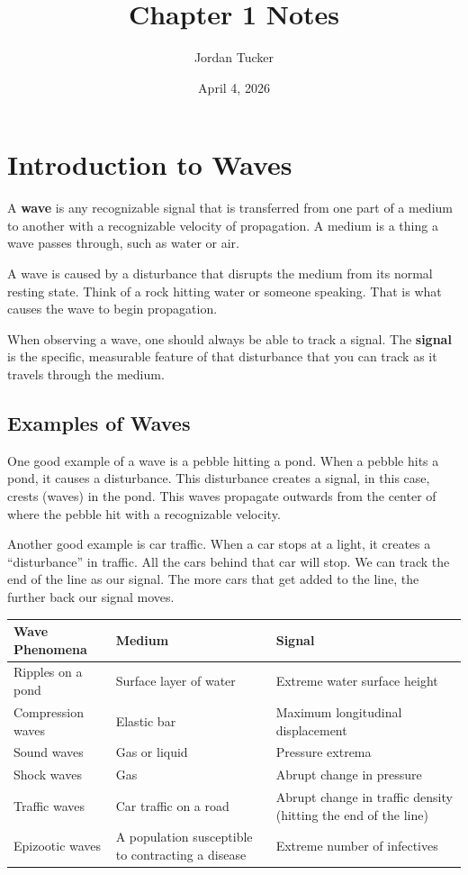 \documentclass[12pt, letterpaper]{article}
\title{Chapter 1 Notes}
\author{Jordan Tucker}
\date{April 4, 2026}
\begin{document}
    \maketitle

    \section{Introduction to Waves}\label{sec:introduction-to-waves}
    A \textbf{wave} is any recognizable signal that is transferred from one part of a medium to another with
    a recognizable velocity of propagation.
    A medium is a thing a wave passes through, such as water
    or air.

    A wave is caused by a disturbance that disrupts the medium from its normal resting state.
    Think of a rock hitting water or someone speaking.
    That is what causes the wave to begin propagation.

    When observing a wave, one should always be able to track a signal.
    The \textbf{signal} is the specific, measurable feature of that disturbance that you can track
    as it travels through the medium.

    \subsection{Examples of Waves}\label{subsec:examples-of-waves}
    One good example of a wave is a pebble hitting a pond.
    When a pebble hits a pond, it causes a disturbance.
    This disturbance creates a signal, in this case, crests (waves) in the pond.
    This waves propagate outwards from the center of where the pebble hit with a recognizable
    velocity.

    Another good example is car traffic.
    When a car stops at a light, it creates a ``disturbance'' in traffic.
    All the cars behind that car will stop.
    We can track the end of the line as our signal.
    The more cars that get added to the line, the further back our signal moves.

    \begin{tabularx}{\textwidth}{|l | X | X|}
        \hline
        \textbf{Wave Phenomena} & \textbf{Medium} & \textbf{Signal}\\
        \hline
        Ripples on a pond & Surface layer of water & Extreme water surface height \\
        Compression waves & Elastic bar & Maximum longitudinal displacement\\
        Sound waves & Gas or liquid & Pressure extrema \\
        Shock waves & Gas & Abrupt change in pressure \\
        Traffic waves & Car traffic on a road & Abrupt change in traffic density (hitting the end of the line) \\
        Epizootic waves & A population susceptible to contracting a disease & Extreme number of infectives \\
        \hline
    \end{tabularx}
\end{document}
